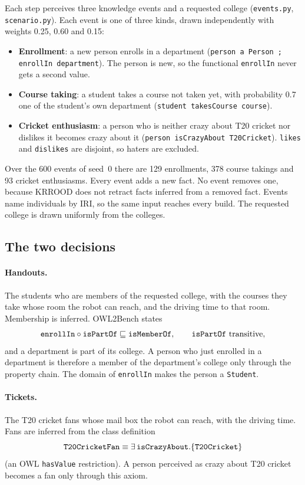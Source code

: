 \documentclass[10pt]{article}
\newcommand{\brkunderscore}{\textunderscore\allowbreak}
\newcommand{\code}[1]{{\let\_\brkunderscore\texttt{#1}}}
\newcommand{\file}[1]{{\let\_\brkunderscore\texttt{#1}}}
\begin{document}
Each step perceives three knowledge events and a requested college (\file{events.py}, \file{scenario.py}). Each event is
one of three kinds, drawn independently with weights 0.25, 0.60 and 0.15:
\begin{itemize}
  \item \textbf{Enrollment}: a new person enrolls in a department (\code{person a Person ; enrollIn department}). The
        person is new, so the functional \code{enrollIn} never gets a second value.
  \item \textbf{Course taking}: a student takes a course not taken yet, with probability 0.7 one of the student's own
        department (\code{student takesCourse course}).
  \item \textbf{Cricket enthusiasm}: a person who is neither crazy about T20 cricket nor dislikes it becomes crazy
        about it (\code{person isCrazyAbout T20Cricket}). \code{likes} and \code{dislikes} are disjoint, so
        haters are excluded.
\end{itemize}
Over the 600 events of seed~0 there are 129 enrollments, 378 course takings and 93 cricket enthusiasms. Every event
adds a new fact. No event removes one, because KRROOD does not retract facts inferred from a removed fact. Events name
individuals by IRI, so the same input reaches every build. The requested college is drawn uniformly from the colleges.

\subsection{The two decisions}
\label{sec:decisions}

\paragraph{Handouts.} The students who are members of the requested college, with the courses they take whose room the
robot can reach, and the driving time to that room. Membership is inferred. OWL2Bench states
\[
  \code{enrollIn}\circ\code{isPartOf}\sqsubseteq\code{isMemberOf},\qquad \code{isPartOf}\ \text{transitive},
\]
and a department is part of its college. A person who just enrolled in a department is therefore a member of the
department's college only through the property chain. The domain of \code{enrollIn} makes the person a
\code{Student}.

\paragraph{Tickets.} The T20 cricket fans whose mail box the robot can reach, with the driving time. Fans are inferred
from the class definition
\[
  \code{T20CricketFan}\equiv\exists\,\code{isCrazyAbout}.\{\code{T20Cricket}\}
\]
(an OWL \code{hasValue} restriction). A person perceived as crazy about T20 cricket becomes a fan only through this
axiom.
\end{document}
